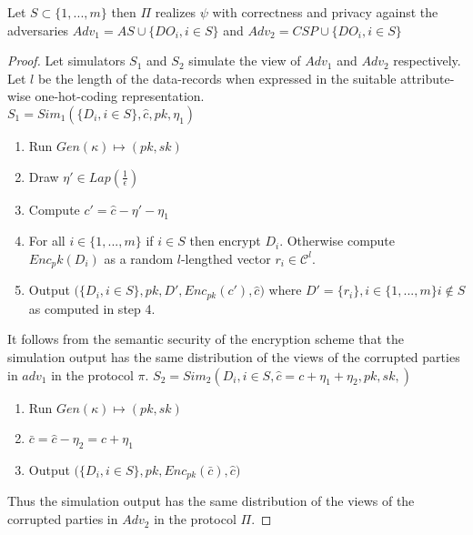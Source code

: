 \begin{theorem}Let $S \subset \{1,...,m\}$ then $\Pi$ realizes $\psi$  with correctness and privacy against
the adversaries $Adv_1=AS \cup \{DO_i, i \in S\}$  and $Adv_2=CSP \cup  \{ DO_i, i \in S\} $\end{theorem}
\begin{proof} \begin{comment}The interactions between the AS and the CSP can be categorized into three types \begin{enumerate}\item Yao's garbled circuits - Primitives: NoisyMax, CountDistinct\item Decryption of masked data - Primitives: GroupBy \item Decryption of differentially private output- Primitives: Laplace \end{enumerate} Thus there are three possibilities for protocol $\pi_2$. For the garbled circuit based protocol $\pi_2$, the output of both the primitives NoisyMax and CountDistinct are differentially private by definition.  Hence by the standard semantic security of garbled circuits \cite{Yao, yao2}, the protocol is secure against a P.P.T adversary revealing nothing other than the differentially private  circuit outputs. 
We will discuss the simulators for the other two cases as follows starting of with the second case, i.e., when the CSP decrypts masked data.
\end{comment}
Let simulators $S_1$ and $S_2$ simulate the view of ${Adv}_1$ and $Adv_2$ respectively. Let $l$ be the length of the data-records when expressed in the suitable attribute-wise one-hot-coding representation.\\
$S_1=Sim_1(\{D_i, i \in S\}, \hat{c}, pk, \eta_1)$
\begin{enumerate}\item Run $Gen(\kappa)\mapsto (pk,sk)$ 
\item Draw $\eta' \in Lap(\frac{1}{\epsilon})$
\item Compute $c'=\hat{c}-\eta'-\eta_1$
\item For all $i \in \{1,...,m\}$ if $i \in S$ then encrypt $D_i$. 
Otherwise compute $Enc_pk(D_i)$ as a random $l$-lengthed vector $r_i \in \mathcal{C}^l$.
\item Output $\Big(\{D_i, i \in S\},pk,D',Enc_{pk}(c'),\hat{c} \Big)$ where $D'=\{r_i\},i \in \{1,...,m\} i \not \in S$ as computed in step 4.
\end{enumerate}
It follows from the semantic security of the encryption scheme that the simulation
output has the same distribution of the views of the corrupted parties in $adv_1$ in the
protocol $\pi$.
$S_2=Sim_2(D_i, i \in S, \hat{c}=c+\eta_1+\eta_2,pk,sk,)$
\begin{enumerate}\item Run $Gen(\kappa)\mapsto (pk,sk)$ \item $\bar{c}=\hat{c}-\eta_2=c+\eta_1$
\item Output $\Big(\{D_i, i \in S\},pk,Enc_{pk}(\bar{c}),\hat{c} \Big)$
\end{enumerate}
Thus the simulation output has the same distribution of the
views of the corrupted parties in $Adv_2$ in the protocol $\Pi$. 


\end{proof}